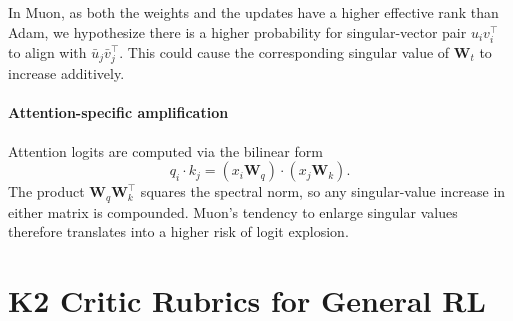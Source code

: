 In Muon, as both the weights and the updates have a higher effective rank than Adam, we hypothesize there is a higher probability for singular-vector pair $u_i v_i^{\top}$ to align with $\bar u_j \bar v_j^{\top}$. This could cause the corresponding singular value of $\mathbf W_t$ to increase additively.

\paragraph{Attention-specific amplification}  
Attention logits are computed via the bilinear form
\begin{equation}
q_i\cdot k_j=(x_i \mathbf W_q)\cdot (x_j \mathbf W_k).
\end{equation}
The product $\mathbf W_q\mathbf W_k^{\top}$ squares the spectral norm, so any singular-value increase in either matrix is compounded.  Muon's tendency to enlarge singular values therefore translates into a higher risk of logit explosion.



\section{K2 Critic Rubrics for General RL}

